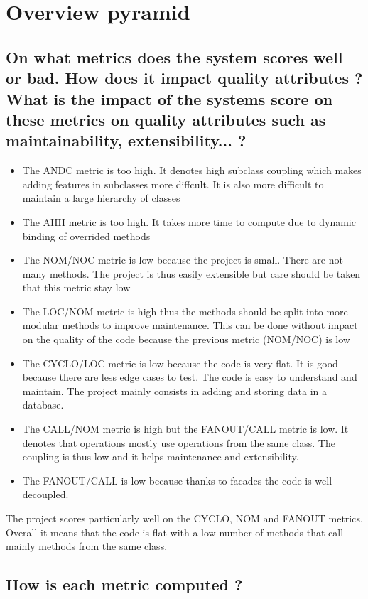 \section{Overview pyramid}

\subsection{On what metrics does the system scores well or bad. How does it impact quality attributes ? What is the impact of the systems score on these metrics on quality attributes
such as maintainability, extensibility... ?}

\begin{itemize}
    \item The ANDC metric is too high. It denotes high subclass coupling which makes adding features in subclasses more diffcult. It is also more difficult to maintain a large hierarchy of classes
    \item The AHH metric is too high. It takes more time to compute due to dynamic binding of overrided methods
    \item The NOM/NOC metric is low because the project is small. There are not many methods. The project is thus easily extensible but care should be taken that this metric stay low
    \item The LOC/NOM metric is high thus the methods should be split into more modular methods to improve maintenance. This can be done without impact on the quality of the code because the previous metric (NOM/NOC) is low
    \item The CYCLO/LOC metric is low because the code is very flat. It is good because there are less edge cases to test. The code is easy to understand and maintain. The project mainly consists in adding and storing data in a database.
    \item The CALL/NOM metric is high but the FANOUT/CALL metric is low. It denotes that operations mostly use operations from the same class. The coupling is thus low and it helps maintenance and extensibility.
    \item The FANOUT/CALL is low because thanks to facades the code is well decoupled.
\end{itemize}

The project scores particularly well on the CYCLO, NOM and FANOUT metrics. Overall it means that the code is flat with a low number of methods that call mainly methods from the same class.

\subsection{How is each metric computed ?}

